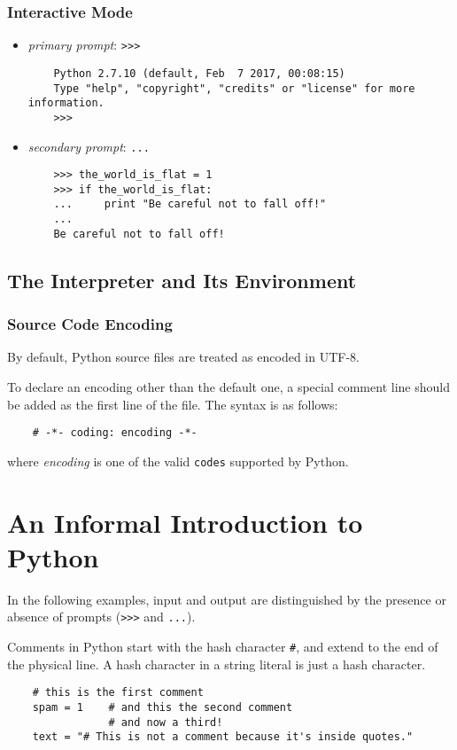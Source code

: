\documentclass[UTF8]{article}
\begin{document}
\subsubsection{Interactive Mode}
\begin{itemize}
    \item \emph{primary prompt}: \texttt{>>>}
    \begin{verbatim}
    Python 2.7.10 (default, Feb  7 2017, 00:08:15)
    Type "help", "copyright", "credits" or "license" for more information.
    >>>
    \end{verbatim}
    \item \emph{secondary prompt}: \texttt{...}
    \begin{verbatim}
    >>> the_world_is_flat = 1
    >>> if the_world_is_flat:
    ...     print "Be careful not to fall off!"
    ...
    Be careful not to fall off!
    \end{verbatim}
\end{itemize}

\subsection{The Interpreter and Its Environment}
\subsubsection{Source Code Encoding}
By default, Python source files are treated as encoded in UTF-8.

To declare an encoding other than the default one, a special comment line should be added as the
first line of the file. The syntax is as follows:
\begin{verbatim}
    # -*- coding: encoding -*-
\end{verbatim}
where \emph{encoding} is one of the valid \texttt{codes} supported by Python.

\section{An Informal Introduction to Python}
In the following examples, input and output are distinguished by the presence or absence of prompts
(\texttt{>>>} and \texttt{...}).

Comments in Python start with the hash character \texttt{\#}, and extend to the end of the physical
line. A hash character in a string literal is just a hash character.

\begin{verbatim}
    # this is the first comment
    spam = 1    # and this the second comment
                # and now a third!
    text = "# This is not a comment because it's inside quotes."
\end{verbatim}
\end{document}
